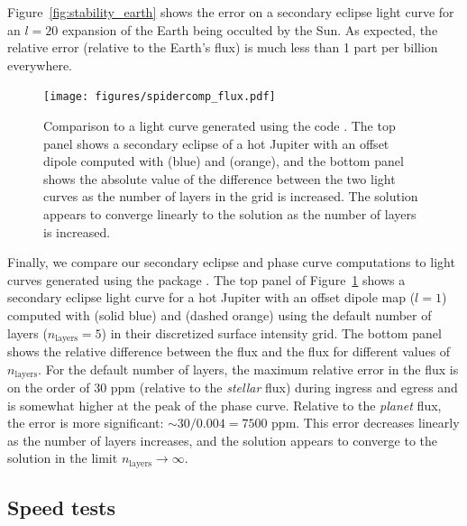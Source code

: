 \documentclass[modern]{aastex61}
\begin{document}
Figure~\ref{fig:stability_earth} shows the error on a secondary eclipse
light curve for an $l = 20$ expansion of the Earth being occulted by the Sun.
As expected, the relative error (relative to the Earth's flux) is much less than 1 part
per billion everywhere.

\begin{figure}[ht!]
    \begin{centering}
    \texttt{[image: figures/spidercomp\_flux.pdf]}
    \caption{\label{fig:spidercomp_flux}
             Comparison to a light curve generated using the \spiderman code
             \citep{Louden2018}. The top panel shows a secondary eclipse of a
             hot Jupiter with an offset dipole computed with \starry (blue)
             and \spiderman (orange), and the bottom panel shows the absolute
             value of the difference between the two light curves as the number
             of layers in the \spiderman grid is increased. The \spiderman solution
             appears to converge linearly to the \starry solution as the number of layers
             is increased.
             }
    \end{centering}
\end{figure}

Finally, we compare our secondary eclipse and phase curve computations to
light curves generated using the \spiderman package \citep{Louden2018}.
The top panel of Figure~\ref{fig:spidercomp_flux} shows a secondary eclipse light curve
for a hot Jupiter with an offset dipole map ($l = 1$) computed with
\starry (solid blue) and \spiderman (dashed orange) using the default number
of layers ($n_\mathrm{layers} = 5$) in their discretized surface intensity grid.
The bottom panel shows the relative difference between the \spiderman flux and
the \starry flux for different values of $n_\mathrm{layers}$. For the default
number of layers, the maximum relative error in the \spiderman flux is on the
order of 30 ppm (relative to the \emph{stellar} flux)
during ingress and egress and is somewhat higher at the peak
of the phase curve. Relative to the \emph{planet} flux, the error is more significant: $\sim 30 / 0.004 = 7500$ ppm.
This error decreases linearly as the number of layers increases, and the \spiderman solution
appears to converge to the \starry solution in the limit $n_\mathrm{layers} \rightarrow \infty$.

\subsection{Speed tests}
\label{sec:starryspeed}
\end{document}
